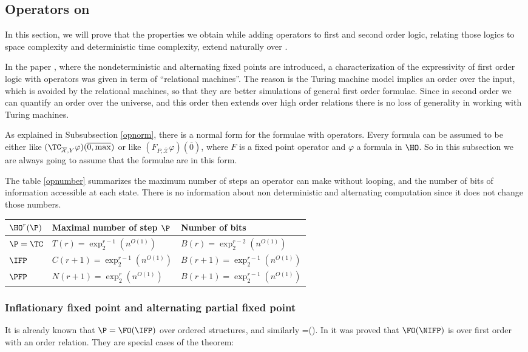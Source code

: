 \documentclass[a4paper,12pt]{article}
\newcommand{\sss}[1]{\subsubsection{#1}}
\theoremstyle{definition}
\renewcommand{\phi}{\varphi}
\newcommand{\hoa}[1]{\ensuremath{\HO^{#1}}}
\newcommand{\ex}[1]{\ensuremath{\exp_{2}^{#1}(n^{O(1)})}}
\newcommand{\ol}{\overline}
\newcommand{\olmc}[1]{\overline{\mathcal{#1}}}
\begin{document}
\subsection{Operators on \HO}
In this section, we will prove that the properties we obtain while
adding operators to first and second order logic, relating those
logics to space complexity and deterministic time complexity, extend
naturally over \HO.

In the paper \cite{nfp}, where the nondeterministic and alternating
fixed points are introduced, a characterization of the expressivity of
first order logic with operators was given in term of ``relational
machines''. The reason is the Turing machine model implies an order
over the input, which is avoided by the relational machines, so that
they are better simulations of general first order formulae. Since in
second order we can quantify an order over the universe, and this
order then extends over high order relations there is no loss of
generality in working with Turing machines.

As explained in Subsubsection \ref{opnorm}, there is a normal form for
the formulae with operators. Every formula can be assumed to be
either like $(\TC_{\olmc X,Y}\phi)(\ol{0,\max})$ or like $(F_{P,\olmc
  X}\phi)(\ol 0)$, where $F$ is a fixed point operator and $\phi$ a
formula in $\HO$. So in this subsection we are always going to assume
that the formulae are in this form.

The table \ref{opnumber} summarizes the maximum number of steps an operator
can make without looping, and the number of bits of information
accessible at each state. There is no information about non
deterministic and alternating computation since it does not change
those numbers.
\begin{table*}\caption{Numbers of the fixed point.}
\label{opnumber}
  \centering
    \begin{tabular}{|l|l|l|}
      \hline
      $\hoa r(\P)$&Maximal number of step $\P$&Number of
      bits \\
      \hline
      $\P=\TC$&$T(r)=\ex{r-1}$&$B(r)=\ex {r-2}$\\
      $\IFP$&$C(r+1)=\ex{r-1}$&$B(r+1)=\ex {r-1}$\\
      $\PFP$&$N(r+1)=\ex r$&$B(r+1)=\ex {r-1}$\\
      \hline
    \end{tabular}
\end{table*}

\sss{Inflationary fixed point and alternating partial fixed point}
It is already known that $\P=\FO(\IFP)$ over ordered structures, and similarly
\EXP=\SO(\IFP).  In \cite{nfp} it was proved that $\FO(\NIFP)${} is \NP{} over first
order with an order relation.  They are special cases of the theorem:
\end{document}
